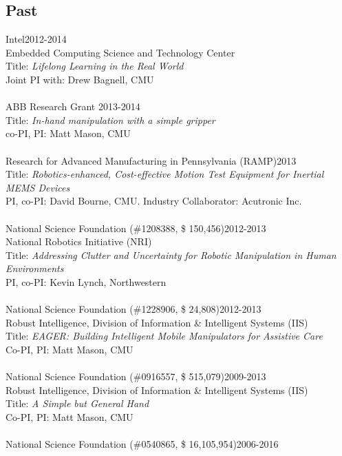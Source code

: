 \documentclass[10pt]{article}
\begin{document}
\subsection{Past}
\noindent
Intel\hfill 2012-2014\\
Embedded Computing Science and Technology Center\\
Title: \textit{Lifelong Learning in the Real World}\\
Joint PI with: Drew Bagnell, CMU\\
\\
ABB Research Grant \hfill 2013-2014\\
Title: \textit{In-hand manipulation with a simple gripper}\\
co-PI, PI: Matt Mason, CMU\\
\\
Research for Advanced Manufacturing in Pennsylvania (RAMP)\hfill 2013\\
Title: \textit{Robotics-enhanced, Cost-effective Motion Test Equipment for Inertial MEMS Devices}\\
PI, co-PI: David Bourne, CMU. Industry Collaborator: Acutronic Inc.\\
\\
National Science Foundation (\#1208388, \$ 150,456)\hfill 2012-2013\\
National Robotics Initiative (NRI)\\
Title: \textit{Addressing Clutter and Uncertainty for Robotic Manipulation in Human Environments}\\
PI, co-PI: Kevin Lynch, Northwestern\\
\\
National Science Foundation (\#1228906, \$ 24,808)\hfill 2012-2013\\
Robust Intelligence, Division of Information \& Intelligent Systems (IIS)\\
Title: \textit{ EAGER: Building Intelligent Mobile Manipulators for Assistive Care
}\\
Co-PI, PI: Matt Mason, CMU\\
\\
National Science Foundation (\#0916557, \$ 515,079)\hfill 2009-2013\\
Robust Intelligence, Division of Information \& Intelligent Systems (IIS)\\
Title: \textit{A Simple but General Hand}\\
Co-PI, PI: Matt Mason, CMU\\
\\
National Science Foundation (\#0540865, \$ 16,105,954)\hfill 2006-2016\\
\end{document}
